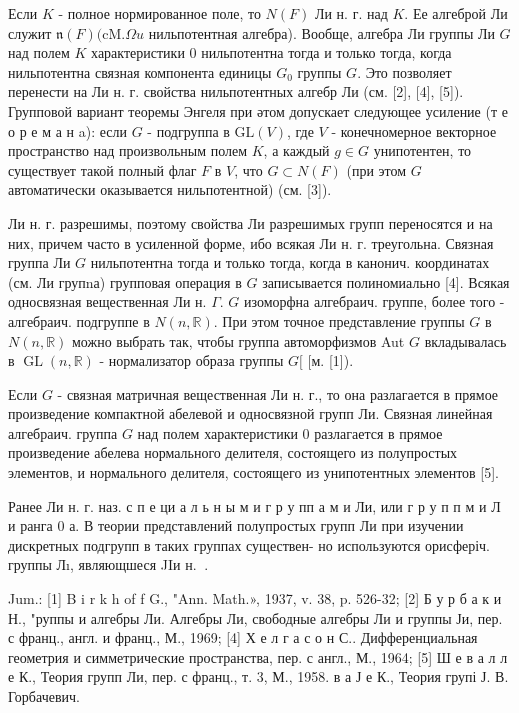 \documentclass[10pt]{article}
\begin{document}
Если $K$ - полное нормированное поле, то $N(F)$ Ли н. г. над $K$. Ее алгеброй Ли служит $\mathfrak{n}(F)(\mathrm{cM} . \Omega u$ нильпотентная алгебра). Вообще, алгебра Ли группы Ли $G$ над полем $K$ характеристики 0 нильпотентна тогда и только тогда, когда нильпотентна связная компонента единицы $G_{0}$ группы $G$. Это позволяет перенести на Ли н. г. свойства нильпотентных алгебр Ли (см. [2], [4], [5]). Групповой вариант теоремы Энгеля при әтом допускает следующее усиление (т е о р е м а н a): если $G$ - подгруппа в $\mathrm{GL}(V)$, где $V$ - конечномерное векторное пространство над произвольным полем $K$, а каждый $g \in G$ унипотентен, то существует такой полный флаг $F$ в $V$, что $G \subset N(F)$ (при этом $G$ автоматически оказывается нильпотентной) (см. [3]).



Ли н. г. разрешимы, поэтому свойства Ли разрешимых групп переносятся и на них, причем часто в усиленной форме, ибо всякая Ли н. г. треугольна. Связная группа Ли $G$ нильпотентна тогда и только тогда, когда в канонич. координатах (см. Ли групnа) групповая операция в $G$ записывается полиномиально [4]. Всякая односвязная вещественная Ли н. $\Gamma$. $G$ изоморфна алгебраич. группе, более того - алгебраич. подгруппе в $N(n, \mathbb{R})$. При этом точное представление группы $G$ в $N(n, \mathbb{R})$ можно выбрать так, чтобы группа автоморфизмов Aut $G$ вкладывалась в $\operatorname{GL}(n, \mathbb{R})$ - нормализатор образа группы $G[$ [м. [1]).



Если $G$ - связная матричная вещественная Ли н. г., то она разлагается в прямое произведение компактной абелевой и односвязной групп Ли. Связная линейная алгебраич. группа $G$ над полем характеристики 0 разлагается в прямое произведение абелева нормального делителя, состоящего из полупростых элементов, и нормального делителя, состоящего из унипотентных элементов [5].



Ранее Ли н. г. наз. с п е ци а л ь н ы м и г р у пп а м и Ли, или г р у п п м и Л и ранга 0 а. В теории представлений полупростых групп Ли при изучении дискретных подгрупп в таких группах существен- но используются орисферіч. группы Лı, являющшеся JIи н. $\mathbf{~}$.



Jum.: [1] B i r k h of f G., "Ann. Math.», 1937, v. 38, p. 526-32; [2] Б у р б а к и Н., "руппы и алгебры Ли. Алгебры Ли, свободные алгебры Ли и группы Ји, пер. с франц., англ. и франц., М., 1969; [4] Х е л г а с о н С.. Дифференциальная геометрия и симметрические пространства, пер. с англ., М., 1964; [5] Ш е в а л л е К., Теория групп Ли, пер. с франц., т. 3, М., 1958. в а Ј е К., Теория групі Ј. В. Горбачевич.
\end{document}
